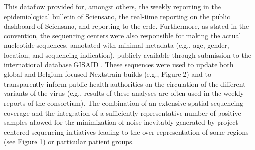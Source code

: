 This dataflow provided for, amongst others, the weekly reporting in the epidemiological bulletin of Sciensano, the real-time reporting on the public dashboard of Sciensano, and reporting to the \gls{ecdc}.
Furthermore, as stated in the convention, the sequencing centers were also responsible for making the actual nucleotide sequences, annotated with minimal metadata (e.g., age, gender, location, and sequencing indication), publicly available through submission to the international database GISAID \citep{shu2017gisaid}.
These sequences were used to update both global and Belgium-focused Nextstrain builds (e.g., Figure 2) and to transparently inform public health authorities on the circulation of the different variants of the virus (e.g., results of these analyses are often used in the weekly reports of the consortium).
The combination of an extensive spatial sequencing coverage and the integration of a sufficiently representative number of positive samples allowed for the minimization of noise inevitably generated by project-centered sequencing initiatives leading to the over-representation of some regions (see Figure 1) or particular patient groups.


